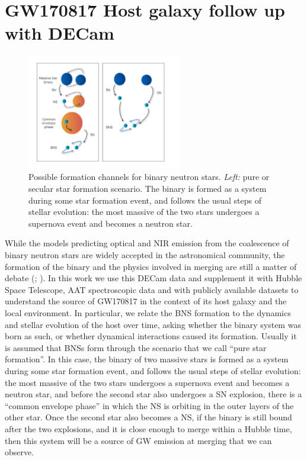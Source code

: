 
\section{GW170817 Host galaxy follow up with DECam}\label{sec:gw170817}

\begin{figure}
\centering
\includegraphics[width=0.6\textwidth]{./chapters/chapter3/Figures/diagram.pdf}
\caption{Possible formation channels for binary neutron stars. \emph{Left:} pure or secular star formation scenario. The binary is formed as a system during some star formation event, and follows the usual steps of stellar evolution: the most massive of the two stars undergoes a supernova event and becomes a neutron star.}\label{formationfig}\end{figure}

While the models predicting optical and NIR emission from the coalescence of binary neutron stars are widely accepted in the astronomical community, the formation of the binary and the physics involved in merging are still a matter of debate (\citealt{bns}; \citealt{bns2}). In this work we use this DECam data and supplement it with Hubble Space Telescope, AAT spectroscopic data and with publicly available datasets to understand the source of GW170817 in the context of its host galaxy and the local environment. In particular, we relate the BNS formation to the dynamics and stellar evolution of the host over time, asking whether the binary system was born as such, or whether dynamical interactions caused its formation. Usually it is assumed that BNSs form through the scenario that we call ``pure star formation''. In this case, the binary of two massive stars is formed as a system during some star formation event, and follows the usual steps of stellar evolution: the most massive of the two stars undergoes a supernova event and becomes a neutron star, and before the second star also undergoes a SN explosion, there is a ``common envelope phase'' in which the NS is orbiting in the outer layers of the other star. Once the second star also becomes a NS, if the binary is still bound after the two explosions, and it is close enough to merge within a Hubble time, then this system will be a source of GW emission at merging that we can observe.

